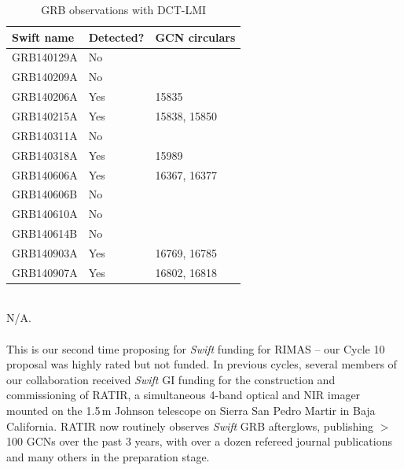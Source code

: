 \documentclass[letterpaper,11pt]{article}
\begin{document}
	\begin{table}[ht]
		\vspace{-0.4cm}
		\centering 
		\begin{tabular}{lll}
			\hline\hline
			\textbf{Swift name} & \textbf{Detected?} & \textbf{GCN circulars}		\\
			\hline
			GRB140129A			& No					&							\\
			GRB140209A			& No					&							\\
			GRB140206A			& Yes					& 15835						\\
			GRB140215A			& Yes					& 15838, 15850				\\
			GRB140311A			& No					&							\\
			GRB140318A			& Yes					& 15989						\\
			GRB140606A			& Yes					& 16367, 16377				\\
			GRB140606B			& No					&							\\
			GRB140610A			& No					&							\\
			GRB140614B			& No					&							\\
			GRB140903A			& Yes					& 16769, 16785				\\
			GRB140907A			& Yes					& 16802, 16818				\\
			\hline
		\end{tabular}
		\caption{GRB observations with DCT-LMI}
		\label{table:DCTobs} 
	\end{table}

\smallskip\\
N/A.\\

\smallskip\\
This is our second time proposing for \textit{Swift} funding for RIMAS --
our Cycle 10 proposal was highly rated but not funded.  In previous cycles,
several members of our collaboration received \textit{Swift} GI funding for the 
construction and commissioning of RATIR, a simultaneous 4-band optical and NIR
imager mounted on the 1.5\,m Johnson telescope on Sierra San Pedro Martir in Baja 
California.  RATIR now routinely observes \textit{Swift} GRB afterglows, publishing
$>$ 100 GCNs over the past 3 years, with over a dozen refereed journal publications and 
many others in the preparation stage. \\
\end{document}

